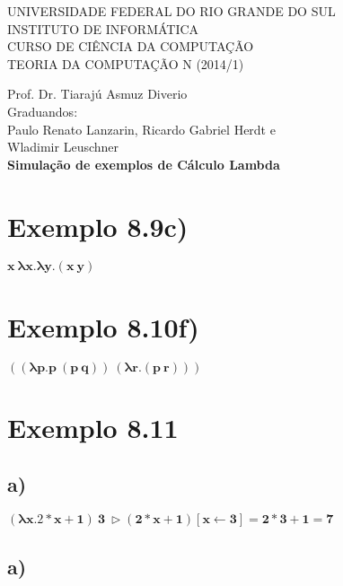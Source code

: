 \documentclass[a4paper]{article}
\begin{document}
\begin{center}


\large{ 
\uppercase{ Universidade Federal do Rio Grande do Sul\\

Instituto de Informática \\

Curso de Ciência da Computação \\

Teoria da Computação N (2014/1)\\
}

Prof. Dr. Tiarajú Asmuz Diverio \\


Graduandos: \\ Paulo Renato Lanzarin, Ricardo Gabriel Herdt e \\
	Wladimir Leuschner \\[1.5cm]



\LARGE {\bfseries Simulação de exemplos de Cálculo Lambda \\[1.0cm]
}}

\end{center}

\section*{Exemplo 8.9c)}

$\mathbf{x\ \lambda x.\lambda y.(x\ y)}$

\section*{Exemplo 8.10f)}

$\mathbf{((\lambda p.p\ (p\ q))\ (\lambda r.(p\ r)))}$

\section*{Exemplo 8.11}
\subsection*{a)}
$\mathbf{(\lambda x.2 * x + 1)\ 3\ \rhd (2 * x + 1) [x \leftarrow 3] = 2*3 + 1 = 7}$

\subsection*{a)}
\end{document}
